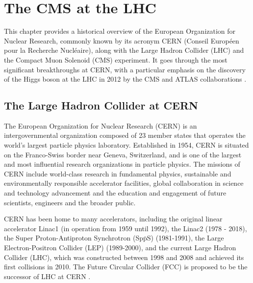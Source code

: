 \chapter[The CMS at the LHC]{The CMS at the LHC}\label{chap:CMS_LHC}

This chapter provides a historical overview of the European Organization for Nuclear Research, commonly known by its acronym CERN (Conseil Européen pour la Recherche Nucléaire), along with the Large Hadron Collider (LHC) and the Compact Muon Solenoid (CMS) experiment. It goes through the most significant breakthroughs at CERN, with a particular emphasis on the discovery of the Higgs boson at the LHC in 2012 by the CMS and ATLAS collaborations \cite{CMS:2012qbp,ATLAS:2012yve}.

\section{The Large Hadron Collider at CERN}\label{sec:LHC}

The European Organization for Nuclear Research (CERN) is an intergovernmental organization composed of 23 member states that operates the world's largest particle physics laboratory. Established in 1954, CERN is situated on the Franco-Swiss border near Geneva, Switzerland, and is one of the largest and most influential research organizations in particle physics. The missions of CERN include world-class research in fundamental physics, sustainable and environmentally responsible accelerator facilities, global collaboration in science and technology advancement and the education and engagement of future scientists, engineers and the broader public.

CERN has been home to many accelerators, including the original linear accelerator Linac1 (in operation from 1959 until 1992), the Linac2 (1978 - 2018), the Super Proton-Antiproton Synchrotron (Sp$\bar{\text{p}}$S) (1981-1991), the Large Electron-Positron Collider (LEP) (1989-2000), and the current Large Hadron Collider (LHC), which was constructed between 1998 and 2008 and achieved its first collisions in 2010. The Future Circular Collider (FCC) is proposed to be the successor of LHC at CERN \cite{FCC:2018byv}.

